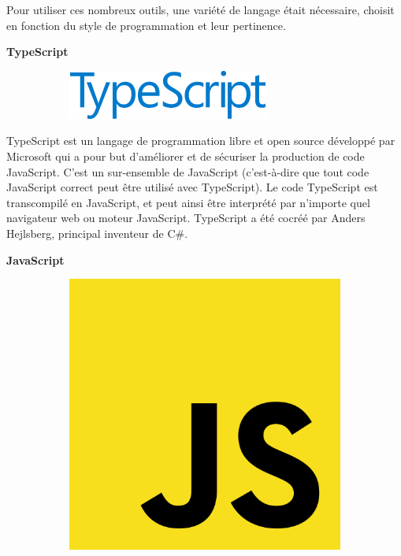 \documentclass{article}
\begin{document}
Pour utiliser ces nombreux outils, une variété de langage était nécessaire, choisit en fonction du style de programmation et leur pertinence.
\newline

\textbf{TypeScript}

\begin{figure}[h!]
	\centering
  	\begin{subfigure}[b]{0.25\linewidth}
	\includegraphics[width=\linewidth]{type.png}
  	\end{subfigure}
\end{figure}

TypeScript est un langage de programmation libre et open source développé par Microsoft qui a pour but d'améliorer et de sécuriser la production de code JavaScript. C'est un sur-ensemble de JavaScript (c'est-à-dire que tout code JavaScript correct peut être utilisé avec TypeScript). Le code TypeScript est transcompilé en JavaScript, et peut ainsi être interprété par n'importe quel navigateur web ou moteur JavaScript. TypeScript a été cocréé par Anders Hejlsberg, principal inventeur de C\#.
\newline

\textbf{JavaScript}
\newline

\begin{figure}[h!]
	\centering
  	\begin{subfigure}[b]{0.15\linewidth}
	\includegraphics[width=\linewidth]{js.png}
  	\end{subfigure}
\end{figure}
\end{document}
